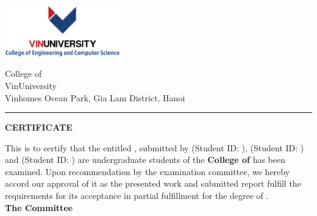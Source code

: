 \thispagestyle{plain}
\noindent
\begin{minipage}{0.37\textwidth}
\includegraphics[width=50mm]{Images/cecs_logo_full}
\end{minipage}
\begin{minipage}{0.63\textwidth}

 College of \College  \\
 VinUniversity\\
 Vinhomes Ocean Park, Gia Lam District, Hanoi
\end{minipage}

\vspace{0.5\baselineskip}
\hrule
\vspace{2\baselineskip}

\begin{center}
{\Large {\bf \uppercase{Certificate}}}
\end{center}




\vspace{\baselineskip}

\noindent 
This is to certify that the \MakeTextLowercase{\RoportType} entitled {\bf \ReportTitle}, submitted by {\bf \firstAuthor} (Student ID: {\firstAuthorID}), {\bf \secondAuthor} (Student ID: {\secondAuthorID}) and {\bf \thirdAuthor} (Student ID: {\thirdAuthorID}) are undergraduate students of the {\bf College of \College } has been examined. Upon recommendation by the examination committee, we hereby accord our approval of it as the presented work and submitted report fulfill the requirements for its acceptance in partial fulfillment for the degree of \emph{\Degree}. \\

\noindent\textbf{The Committee}

